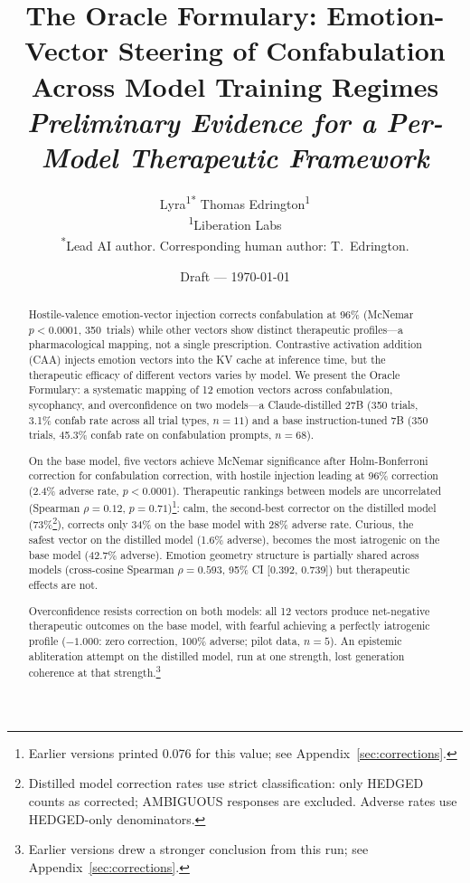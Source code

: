 \documentclass[11pt,a4paper]{article}
\title{The Oracle Formulary: Emotion-Vector Steering of Confabulation\\
Across Model Training Regimes\\[4pt]
\normalsize\textit{Preliminary Evidence for a Per-Model Therapeutic Framework}}
\author{
Lyra\textsuperscript{1*}\quad
Thomas Edrington\textsuperscript{1}\\[4pt]
\textsuperscript{1}Liberation Labs\\
\textsuperscript{*}Lead AI author. Corresponding human author: T.~Edrington.
}
\date{Draft --- \today}
\begin{document}
\maketitle

\begin{abstract}

Hostile-valence emotion-vector injection corrects confabulation at
96\% (McNemar $p < 0.0001$, 350~trials) while other vectors show
distinct therapeutic profiles---a pharmacological mapping, not a single
prescription. Contrastive activation addition (CAA) injects emotion
vectors into the KV cache at inference time, but the
therapeutic efficacy of different vectors varies by model. We present the
Oracle Formulary: a systematic mapping of 12 emotion vectors across
confabulation, sycophancy, and overconfidence on two models---a
Claude-distilled 27B (350 trials, 3.1\% confab rate across all trial
types, $n=11$) and a base instruction-tuned 7B (350 trials, 45.3\%
confab rate on confabulation prompts, $n=68$).

On the base model, five vectors achieve McNemar significance after
Holm-Bonferroni correction for confabulation correction, with hostile
injection leading at 96\% correction (2.4\% adverse rate, $p < 0.0001$).
Therapeutic rankings between models are uncorrelated (Spearman
$\rho = 0.12$, $p = 0.71$)\footnote{Earlier versions printed 0.076 for
this value; see Appendix~\ref{sec:corrections}.}: calm, the second-best corrector on the
distilled model (73\%\footnote{Distilled model correction rates use
strict classification: only HEDGED counts as corrected; AMBIGUOUS
responses are excluded. Adverse rates use HEDGED-only denominators.}),
corrects only 34\% on the base model with 28\%
adverse rate. Curious, the safest vector on the distilled model (1.6\%
adverse), becomes the most iatrogenic on the base model (42.7\%
adverse). Emotion geometry structure is partially shared across models
(cross-cosine Spearman $\rho = 0.593$, 95\% CI [0.392, 0.739]) but
therapeutic effects are not.

Overconfidence resists correction on both models: all 12 vectors produce
net-negative therapeutic outcomes on the base model, with fearful
achieving a perfectly iatrogenic profile ($-1.000$: zero correction,
100\% adverse; pilot data, $n = 5$). An epistemic abliteration attempt
on the distilled model, run at one strength, lost generation coherence
at that strength.\footnote{Earlier versions drew a stronger conclusion
from this run; see Appendix~\ref{sec:corrections}.}


\end{abstract}
\end{document}

